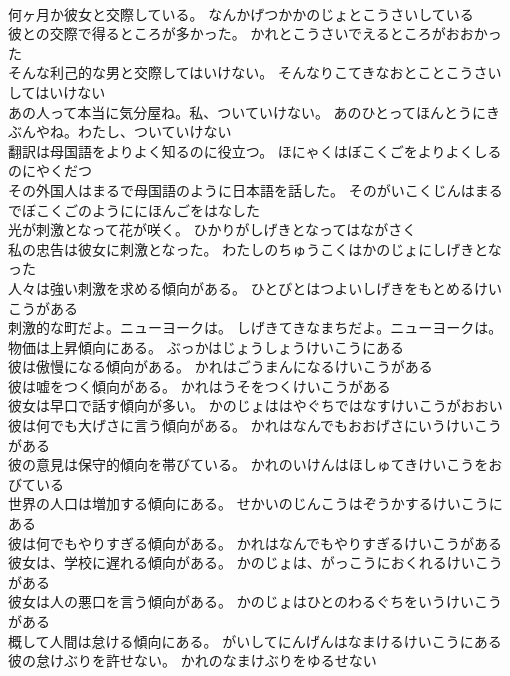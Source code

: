 \documentclass[8pt]{extreport}
\begin{document}
\begin{CJK}{UTF8}{min}
\\	何ヶ月か彼女と交際している。	なんかげつかかのじょとこうさいしている 
\\	彼との交際で得るところが多かった。	かれとこうさいでえるところがおおかった 
\\	そんな利己的な男と交際してはいけない。	そんなりこてきなおとことこうさいしてはいけない 
\\	あの人って本当に気分屋ね。私、ついていけない。	あのひとってほんとうにきぶんやね。わたし、ついていけない 
\\	翻訳は母国語をよりよく知るのに役立つ。	ほにゃくはぼこくごをよりよくしるのにやくだつ 
\\	その外国人はまるで母国語のように日本語を話した。	そのがいこくじんはまるでぼこくごのようににほんごをはなした 
\\	光が刺激となって花が咲く。	ひかりがしげきとなってはながさく 
\\	私の忠告は彼女に刺激となった。	わたしのちゅうこくはかのじょにしげきとなった 
\\	人々は強い刺激を求める傾向がある。	ひとびとはつよいしげきをもとめるけいこうがある 
\\	刺激的な町だよ。ニューヨークは。	しげきてきなまちだよ。ニューヨークは。 
\\	物価は上昇傾向にある。	ぶっかはじょうしょうけいこうにある 
\\	彼は傲慢になる傾向がある。	かれはごうまんになるけいこうがある 
\\	彼は嘘をつく傾向がある。	かれはうそをつくけいこうがある 
\\	彼女は早口で話す傾向が多い。	かのじょははやぐちではなすけいこうがおおい 
\\	彼は何でも大げさに言う傾向がある。	かれはなんでもおおげさにいうけいこうがある 
\\	彼の意見は保守的傾向を帯びている。	かれのいけんはほしゅてきけいこうをおびている 
\\	世界の人口は増加する傾向にある。	せかいのじんこうはぞうかするけいこうにある 
\\	彼は何でもやりすぎる傾向がある。	かれはなんでもやりすぎるけいこうがある 
\\	彼女は、学校に遅れる傾向がある。	かのじょは、がっこうにおくれるけいこうがある 
\\	彼女は人の悪口を言う傾向がある。	かのじょはひとのわるぐちをいうけいこうがある 
\\	概して人間は怠ける傾向にある。	がいしてにんげんはなまけるけいこうにある 
\\	彼の怠けぶりを許せない。	かれのなまけぶりをゆるせない 

\end{CJK}
\end{document}

